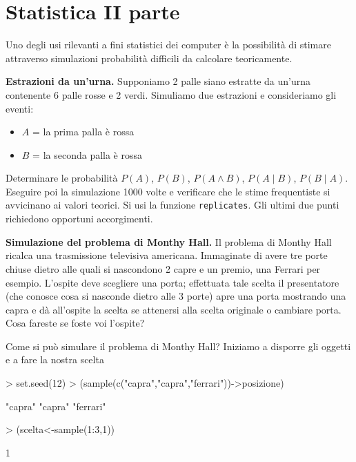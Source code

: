 \documentclass[onecolumn,11pt]{book}
\begin{document}
\chapter{Statistica II parte}
Uno degli usi rilevanti a fini statistici dei computer  \`e la possibilit\`a di stimare attraverso simulazioni probabilit\`a difficili da calcolare teoricamente.  
\begin{shaded}\begin{description}
\item{\bf Estrazioni da un'urna. }Supponiamo 2 palle siano estratte da un'urna contenente 6 palle rosse e 2 verdi. 
Simuliamo due estrazioni e consideriamo gli eventi:  
\begin{itemize}
\item{}$A$ = {la prima palla  \`e rossa}
\item{}$B$ = {la seconda palla \`e rossa}
\end{itemize}
Determinare le probabilit\`a
$P(A)$, $P(B)$,
$P(A\wedge B)$, $P(A \mid B)$,
$P(B \mid A)$.
Eseguire poi la simulazione 1000 volte e verificare che le stime frequentiste si avvicinano ai valori teorici. Si usi la funzione \texttt{replicates}.
Gli ultimi due punti richiedono opportuni accorgimenti.
\item{\bf Simulazione del problema di  Monthy Hall.}
Il problema di Monthy Hall ricalca una trasmissione televisiva americana. Immaginate di avere tre porte chiuse dietro alle quali si nascondono 2 capre e un premio, una Ferrari per esempio. L'ospite deve scegliere una porta; effettuata tale scelta il presentatore (che conosce cosa si nasconde dietro alle 3 porte) apre una porta mostrando una capra e d\`a all'ospite la scelta se attenersi alla scelta originale o cambiare porta. Cosa fareste se foste voi l'ospite?
\end{description} 
\end{shaded}
Come si pu\`o simulare il problema di Monthy Hall?
Iniziamo a disporre gli oggetti e a fare la nostra scelta
\begin{Schunk}
\begin{Sinput}
> set.seed(12)
> (sample(c("capra","capra","ferrari"))->posizione)
\end{Sinput}
\begin{Soutput}
[1] "capra"   "capra"   "ferrari"
\end{Soutput}
\begin{Sinput}
> (scelta<-sample(1:3,1))
\end{Sinput}
\begin{Soutput}
[1] 1
\end{Soutput}
\end{Schunk}
\end{document}
